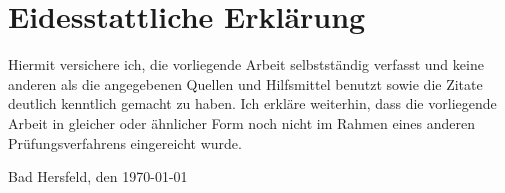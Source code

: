 
\chapter*{Eidesstattliche Erklärung}

Hiermit versichere ich, die vorliegende Arbeit selbstständig verfasst und keine anderen als die angegebenen Quellen und Hilfsmittel benutzt sowie die Zitate deutlich kenntlich gemacht zu haben. Ich erkläre weiterhin, dass die vorliegende Arbeit in gleicher oder ähnlicher Form noch nicht im Rahmen eines anderen Prüfungsverfahrens eingereicht wurde.

\vspace{1cm}
Bad Hersfeld, den \today


 

